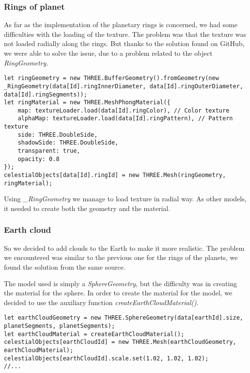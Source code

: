 \documentclass{article}
\begin{document}
\subsubsection{Rings of planet}
As far as the implementation of the planetary rings is concerned, we had some difficulties with the loading of the texture. The problem was that the texture was not loaded radially along the rings. But thanks to the solution found on GitHub\cite{earthcloudsradiustexture:github}, we were able to solve the issue, due to a problem related to the object \textit{RingGeometry}\cite{documentation:threejs}.
\begin{lstlisting}
let ringGeometry = new THREE.BufferGeometry().fromGeometry(new _RingGeometry(data[Id].ringInnerDiameter, data[Id].ringOuterDiameter, data[Id].ringSegments));
let ringMaterial = new THREE.MeshPhongMaterial({
	map: textureLoader.load(data[Id].ringColor), // Color texture
	alphaMap: textureLoader.load(data[Id].ringPattern), // Pattern texture
	side: THREE.DoubleSide,
	shadowSide: THREE.DoubleSide,
	transparent: true,
	opacity: 0.8
});
celestialObjects[data[Id].ringId] = new THREE.Mesh(ringGeometry, ringMaterial);
\end{lstlisting}
Using \textit{\_RingGeometry} we manage to load texture in radial way.
As other models, it needed to create both the geometry and the material.

\subsubsection{Earth cloud}
So we decided to add clouds to the Earth to make it more realistic. The problem we encountered was similar to the previous one for the rings of the planets, we found the solution from the same source\cite{documentation:threejs}.
\par The model used is simply a \textit{SphereGeometry}\cite{documentation:threejs}, but the difficulty was in creating the material for the sphere. In order to create the material for the model, we decided to use the auxiliary function \textit{createEarthCloudMaterial()}.
\begin{lstlisting}
let earthCloudGeometry = new THREE.SphereGeometry(data[earthId].size, planetSegments, planetSegments);
let earthCloudMaterial = createEarthCloudMaterial();
celestialObjects[earthCloudId] = new THREE.Mesh(earthCloudGeometry, earthCloudMaterial);
celestialObjects[earthCloudId].scale.set(1.02, 1.02, 1.02);
//...
\end{lstlisting}
\end{document}
